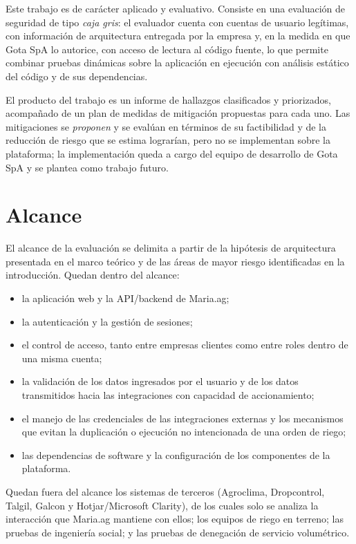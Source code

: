 \documentclass[12pt,letterpaper]{report}
\begin{document}
Este trabajo es de carácter aplicado y evaluativo. Consiste en una evaluación
de seguridad de tipo \textit{caja gris}: el evaluador cuenta con cuentas de
usuario legítimas, con información de arquitectura entregada por la empresa y,
en la medida en que Gota SpA lo autorice, con acceso de lectura al código
fuente, lo que permite combinar pruebas dinámicas sobre la aplicación en
ejecución con análisis estático del código y de sus dependencias.

El producto del trabajo es un informe de hallazgos clasificados y priorizados,
acompañado de un plan de medidas de mitigación propuestas para cada uno. Las
mitigaciones se \textit{proponen} y se evalúan en términos de su factibilidad y
de la reducción de riesgo que se estima lograrían, pero no se implementan
sobre la plataforma; la implementación queda a cargo del equipo de desarrollo
de Gota SpA y se plantea como trabajo futuro.

\section*{Alcance}

El alcance de la evaluación se delimita a partir de la hipótesis de
arquitectura presentada en el marco teórico y de las áreas de mayor riesgo
identificadas en la introducción. Quedan dentro del alcance:

\begin{itemize}[leftmargin=1.25cm]
    \item la aplicación web y la API/backend de Maria.ag;
    \item la autenticación y la gestión de sesiones;
    \item el control de acceso, tanto entre empresas clientes como entre roles
    dentro de una misma cuenta;
    \item la validación de los datos ingresados por el usuario y de los datos
    transmitidos hacia las integraciones con capacidad de accionamiento;
    \item el manejo de las credenciales de las integraciones externas y los
    mecanismos que evitan la duplicación o ejecución no intencionada de una
    orden de riego;
    \item las dependencias de software y la configuración de los componentes de
    la plataforma.
\end{itemize}

Quedan fuera del alcance los sistemas de terceros (Agroclima, Dropcontrol,
Talgil, Galcon y Hotjar/Microsoft Clarity), de los cuales solo se analiza la
interacción que Maria.ag mantiene con ellos; los equipos de riego en terreno;
las pruebas de ingeniería social; y las pruebas de denegación de servicio
volumétrico.
\end{document}
